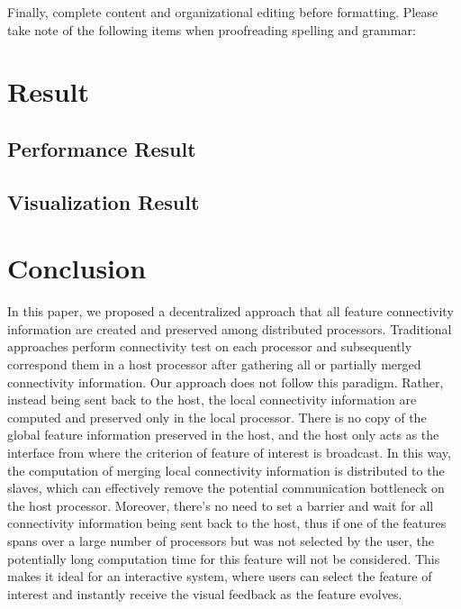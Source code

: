 \documentclass[10pt, conference, compsocconf]{IEEEtran}
\begin{document}
Finally, complete content and organizational editing before formatting. Please take note of the following items when proofreading spelling and grammar:

\section{Result}
\subsection{Performance Result}
\subsection{Visualization Result}

\section{Conclusion}
In this paper, we proposed a decentralized approach that all feature connectivity information are created and preserved among distributed processors. Traditional approaches perform connectivity test on each processor and subsequently correspond them in a host processor after gathering all or partially merged connectivity information. Our approach does not follow this paradigm. Rather, %
instead being sent back to the host, the local connectivity information are computed and preserved only in the local processor. 
There is no copy of the global feature information preserved in the host, and the host only acts as the interface from where the criterion of feature of interest is broadcast. In this way, the computation of merging local connectivity information is distributed to the slaves, which can effectively remove the potential communication bottleneck on the host processor. 
Moreover, there's no need to set a barrier and wait for all connectivity information being sent back to the host, thus if one of the features spans over a large number of processors but was not selected by the user, the potentially long computation time for this feature will not be considered. This makes it ideal for an interactive system, where users can select the feature of interest and instantly receive the visual feedback as the feature evolves. \marginpar{\textcolor{red}{unreadable. it seems to repeat the previous sentences.}}
\end{document}
